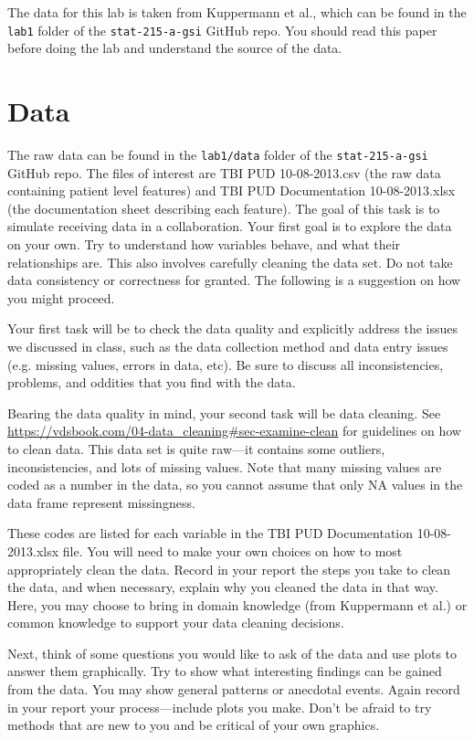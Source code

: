 \documentclass[10pt,letterpaper]{article}
\begin{document}
The data for this lab is taken from Kuppermann et al., which can be found in the \texttt{lab1} folder of the \texttt{stat-215-a-gsi} GitHub repo. You should read this paper before doing the lab and understand the source of the data.

\section*{Data}

The raw data can be found in the \texttt{lab1/data} folder of the \texttt{stat-215-a-gsi} GitHub repo. The files of interest are TBI PUD 10-08-2013.csv (the raw data containing patient level features) and TBI PUD Documentation 10-08-2013.xlsx (the documentation sheet describing each feature). The goal of this task is to simulate receiving data in a collaboration. Your first goal is to explore the data on your own. Try to understand how variables behave, and what their relationships are. This also involves carefully cleaning the data set. Do not take data consistency or correctness for granted. The following is a suggestion on how you might proceed.

Your first task will be to check the data quality and explicitly address the issues we discussed in class, such as the data collection method and data entry issues (e.g. missing values, errors in data, etc). Be sure to discuss all inconsistencies, problems, and oddities that you find with the data.

Bearing the data quality in mind, your second task will be data cleaning. See \url{https://vdsbook.com/04-data_cleaning#sec-examine-clean} for guidelines on how to clean data. This data set is quite raw---it contains some outliers, inconsistencies, and lots of missing values. Note that many missing values are coded as a number in the data, so you cannot assume that only NA values in the data frame represent missingness.

These codes are listed for each variable in the TBI PUD Documentation 10-08-2013.xlsx file. You will need to make your own choices on how to most appropriately clean the data. Record in your report the steps you take to clean the data, and when necessary, explain why you cleaned the data in that way. Here, you may choose to bring in domain knowledge (from Kuppermann et al.) or common knowledge to support your data cleaning decisions.

Next, think of some questions you would like to ask of the data and use plots to answer them graphically. Try to show what interesting findings can be gained from the data. You may show general patterns or anecdotal events. Again record in your report your process---include plots you make. Don’t be afraid to try methods that are new to you and be critical of your own graphics.
\end{document}
